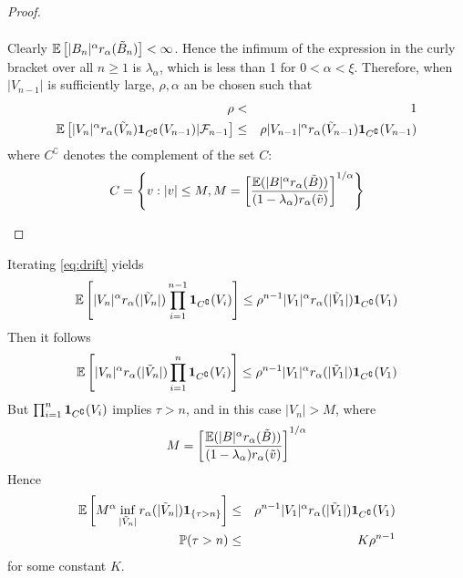 \documentclass{article}
\begin{document}
\begin{proof}
\begin{enumerate}[(i)]
\begin{eqnarray*}
    \end{eqnarray*}
    Clearly $\mathbb{E}\left[|B_n|^\alpha r_{\alpha}(\tilde B_n)\right] <
    \infty$. Hence the infimum of the expression in the curly bracket
    over all $n \geq 1$ is $\lambda_{\alpha}$, which is less than 1 for $0 < \alpha < \xi$.    
    Therefore, when $|V_{n-1}|$ is sufficiently large, $\rho, \alpha$ an be
    chosen such that
    \begin{eqnarray*}
      \rho &<& 1 \\
      \mathbb{E} \left[ |V_n|^\alpha r_{\alpha}(\tilde V_n)  \mathbf{1}_{C^\complement}(V_{n-1})
        | \mathcal F_{n-1} \right] &\leq&
      \rho |V_{n-1}|^\alpha r_{\alpha}(\tilde V_{n-1}) \mathbf{1}_{C^\complement}(V_{n-1})
    \end{eqnarray*}
    where $C^\complement$ denotes the complement of the set $C$:
    \[
    C = \left\{
      v: |v| \leq M, M = \left[
        \mathbb{E} (|B|^\alpha r_\alpha(\tilde B)) 
        \over
        (1 - \lambda_\alpha) r_\alpha(\tilde v)
      \right]^{1/\alpha}
    \right\}
    \]
  \end{enumerate}    
\end{proof}
  Iterating \eqref{eq:drift} yields
  \[
  \mathbb{E} \left[
         |V_n|^\alpha r_{\alpha}(|\tilde V_n|) \prod_{i=1}^{n-1}\mathbf{1}_{C^\complement}(V_i)\right]
      \leq \rho^{n-1} |V_1|^\alpha r_{\alpha}(|\tilde V_1|) \mathbf{1}_{C^\complement}(V_1)
  \]
  Then it follows
  \[
  \mathbb{E} \left[
         |V_n|^\alpha r_{\alpha}(|\tilde V_n|) \prod_{i=1}^{n}\mathbf{1}_{C^\complement}(V_i)\right]
      \leq \rho^{n-1} |V_1|^\alpha r_{\alpha}(|\tilde V_1|) \mathbf{1}_{C^\complement}(V_1)
  \]
  But $\prod_{i=1}^{n}\mathbf{1}_{C^\complement}(V_i)$ implies $\tau > n$, and in this
  case $|V_n| > M$, where
  \[
  M = \left[
        \mathbb{E} (|B|^\alpha r_\alpha(\tilde B)) 
        \over
        (1 - \lambda_\alpha) r_\alpha(\tilde v)
      \right]^{1/\alpha}
  \]
  Hence
  \begin{eqnarray}
    \mathbb{E} \left[
      M^\alpha \inf_{|\tilde V_n|} r_{\alpha}(|\tilde V_n|) \mathbf{1}_{\{\tau > n\}}\right]
    &\leq& \rho^{n-1} |V_1|^\alpha r_{\alpha}(|\tilde V_1|) \mathbf{1}_{C^\complement}(V_1) \nonumber \\
    \mathbb{P}(\tau > n) &\leq& K \rho^{n-1} \label{eq:ret_time}
  \end{eqnarray}
  for some constant $K$.
  
\end{document}
